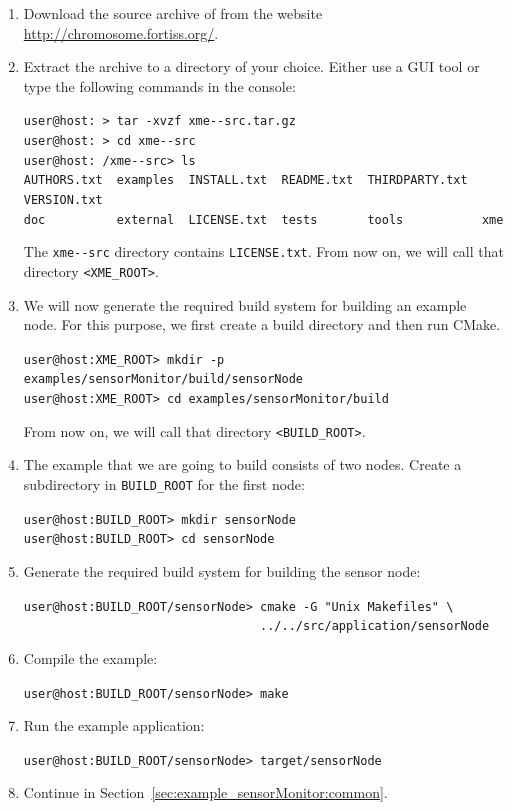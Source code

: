 \begin{enumerate}
	\item Download the source archive of \xme from the website \\
		\url{http://chromosome.fortiss.org/}.
	
	\item Extract the archive to a directory of your choice. Either use a GUI tool or type the following commands in the console:
		
		\texttt{user@host:~> tar -xvzf xme-\xmeVersionNumber{}\xmeVersionSuffix{}-src.tar.gz} \\
		\texttt{user@host:~> cd xme-\xmeVersionNumber{}\xmeVersionSuffix{}-src} \\
		\texttt{user@host:~/xme-\xmeVersionNumber{}\xmeVersionSuffix{}-src> ls} \\
		\verb|AUTHORS.txt  examples  INSTALL.txt  README.txt  THIRDPARTY.txt  VERSION.txt| \\
		\verb|doc          external  LICENSE.txt  tests       tools           xme|
	
		The \texttt{xme-\xmeVersionNumber{}\xmeVersionSuffix{}-src} directory contains \verb|LICENSE.txt|.
		From now on, we will call that directory \verb|<XME_ROOT>|.
	
	\item We will now generate the required build system for building an example node.
		For this purpose, we first create a build directory and then run CMake.
		
		\verb|user@host:XME_ROOT> mkdir -p examples/sensorMonitor/build/sensorNode| \\
		\verb|user@host:XME_ROOT> cd examples/sensorMonitor/build|
		
		From now on, we will call that directory \verb|<BUILD_ROOT>|.
	
	\item The example that we are going to build consists of two nodes.
		Create a subdirectory in \verb|BUILD_ROOT| for the first node:
		
		\verb|user@host:BUILD_ROOT> mkdir sensorNode| \\
		\verb|user@host:BUILD_ROOT> cd sensorNode|
	
	\item Generate the required build system for building the sensor node:
		
		\verb|user@host:BUILD_ROOT/sensorNode> cmake -G "Unix Makefiles" \ | \\
		\verb|                                 ../../src/application/sensorNode|
	
	\item Compile the example:
		
		\verb|user@host:BUILD_ROOT/sensorNode> make|
	
	\item Run the example application:
		
		\verb|user@host:BUILD_ROOT/sensorNode> target/sensorNode|
	
	\item Continue in Section~\ref{sec:example_sensorMonitor:common}.
\end{enumerate}

